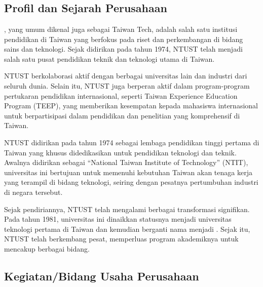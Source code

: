 \chapter{\babDua}

\section{Profil dan Sejarah Perusahaan}

\namaUniv, yang umum dikenal juga sebagai Taiwan Tech, adalah salah satu institusi pendidikan di Taiwan yang berfokus pada riset dan perkembangan di bidang sains dan teknologi. Sejak didirikan pada tahun 1974, NTUST telah menjadi salah satu pusat pendidikan teknik dan teknologi utama di Taiwan.

NTUST berkolaborasi aktif dengan berbagai universitas lain dan industri dari seluruh dunia. Selain itu, NTUST juga berperan aktif dalam program-program pertukaran pendidikan internasional, seperti Taiwan Experience Education Program (TEEP), yang memberikan kesempatan kepada mahasiswa internasional untuk berpartisipasi dalam pendidikan dan penelitian yang komprehensif di Taiwan.

NTUST didirikan pada tahun 1974 sebagai lembaga pendidikan tinggi pertama di Taiwan yang khusus didedikasikan untuk pendidikan teknologi dan teknik. Awalnya didirikan sebagai ``National Taiwan Institute of Technology'' (NTIT), universitas ini bertujuan untuk memenuhi kebutuhan Taiwan akan tenaga kerja yang terampil di bidang teknologi, seiring dengan pesatnya pertumbuhan industri di negara tersebut.

Sejak pendiriannya, NTUST telah mengalami berbagai transformasi signifikan. Pada tahun 1981, universitas ini dinaikkan statusnya menjadi universitas teknologi pertama di Taiwan dan kemudian berganti nama menjadi \namaUniv. Sejak itu, NTUST telah berkembang pesat, memperluas program akademiknya untuk mencakup berbagai bidang.

\section{Kegiatan/Bidang Usaha Perusahaan}

